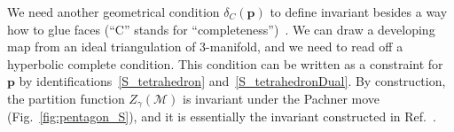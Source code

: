 \documentclass[12pt,reqno]{amsart}
\numberwithin{equation}{section}
\begin{document}
We need another geometrical condition
$ \delta_C(\boldsymbol{p})$
to define invariant
besides a way how to glue faces
(``C'' stands for ``completeness'')~\cite{KHikami01e}.
We can draw a developing map from an ideal triangulation of
3-manifold,
and we need to read off  a hyperbolic complete condition.
This condition
can be written as a constraint for $\boldsymbol{p}$ by
identifications~\eqref{S_tetrahedron} and~\eqref{S_tetrahedronDual}.
By construction, the partition function
$Z_\gamma(\mathcal{M})$
is invariant under the Pachner move (Fig.~\ref{fig:pentagon_S}),
and it is essentially the invariant constructed in
Ref.~.
\end{document}
